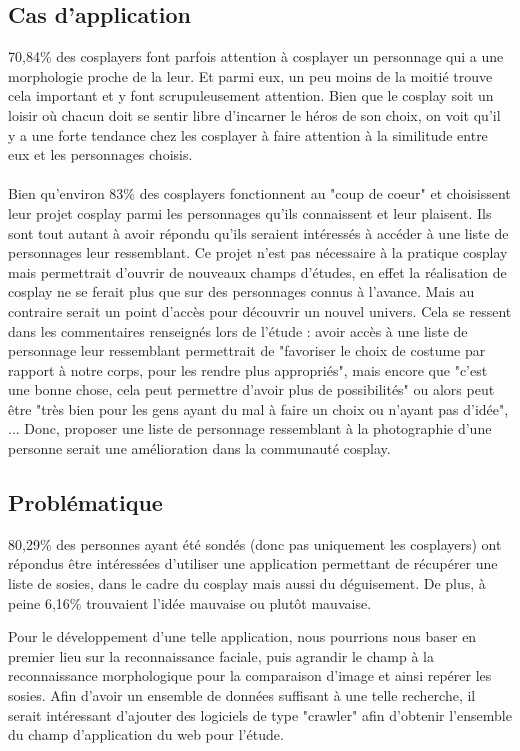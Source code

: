 \documentclass[a4paper,12pt]{article}
\begin{document}
\subsection{Cas d'application}
70,84\% des cosplayers font parfois attention à cosplayer un personnage qui a une morphologie proche de la leur. Et parmi eux, un peu moins de la moitié trouve cela important et y font scrupuleusement attention. Bien que le cosplay soit un loisir où chacun doit se sentir libre d'incarner le héros de son choix, on voit qu'il y a une forte tendance chez les cosplayer à faire attention à la similitude entre eux et les personnages choisis. 
\\ \\
Bien qu'environ 83\% des cosplayers fonctionnent au "coup de coeur" et choisissent leur projet cosplay parmi les personnages qu'ils connaissent et leur plaisent. Ils sont tout autant à avoir répondu qu'ils seraient intéressés à accéder à une liste de personnages leur ressemblant. Ce projet n'est pas nécessaire à la pratique cosplay mais permettrait d'ouvrir de nouveaux champs d'études, en effet la réalisation de cosplay ne se ferait plus que sur des personnages connus à l'avance. Mais au contraire serait un point d'accès pour découvrir un nouvel univers. Cela se ressent dans les commentaires renseignés lors de l'étude : avoir accès à une liste de personnage leur ressemblant permettrait de "favoriser le choix de costume par rapport à notre corps, pour les rendre plus appropriés", mais encore que "c'est une bonne chose, cela peut permettre d'avoir plus de possibilités" ou alors peut être "très bien pour les gens ayant du mal à faire un choix ou n'ayant pas d'idée", ... Donc, proposer une liste de personnage ressemblant à la photographie d'une personne serait une amélioration dans la communauté cosplay.  

\subsection{Problématique}
80,29\% des personnes ayant été sondés (donc pas uniquement les cosplayers) ont répondus être intéressées d'utiliser une application permettant de récupérer une liste de sosies, dans le cadre du cosplay mais aussi du déguisement. De plus, à peine 6,16\% trouvaient l'idée mauvaise ou plutôt mauvaise. 

Pour le développement d'une telle application, nous pourrions nous baser en premier lieu sur la reconnaissance faciale, puis agrandir le champ à la reconnaissance morphologique pour la comparaison d'image et ainsi repérer les sosies. 
Afin d'avoir un ensemble de données suffisant à une telle recherche, il serait intéressant d'ajouter des logiciels de type "crawler" afin d'obtenir l'ensemble du champ d'application du web pour l'étude. 
\end{document}
